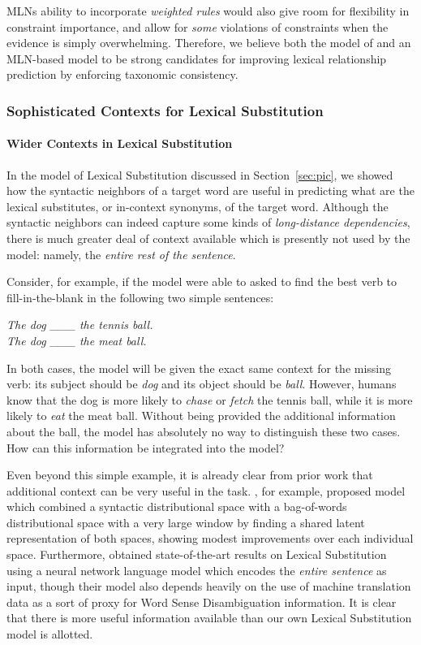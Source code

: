 \documentclass[12pt]{article}
\begin{document}
MLNs ability to incorporate {\em weighted rules} would also give room for
flexibility in constraint importance, and allow for {\em some} violations of
constraints when the evidence is simply overwhelming. Therefore, we believe
both the model of  and an MLN-based model to be strong
candidates for improving lexical relationship prediction by enforcing taxonomic
consistency.

\subsubsection{Sophisticated Contexts for Lexical Substitution}

\paragraph{Wider Contexts in Lexical Substitution}
In the model of Lexical Substitution discussed in Section~\ref{sec:pic}, we
showed how the syntactic neighbors of a target word are useful in predicting
what are the lexical substitutes, or in-context synonyms, of the target word.
Although the syntactic neighbors can indeed capture some kinds of {\em long-distance
dependencies}, there is much greater deal of context available which is
presently not used by the model: namely, the {\em entire rest of the sentence}.

Consider, for example, if the model were able to asked to find the best verb
to fill-in-the-blank in the following two simple sentences:

\begin{center}
  {\em The dog \_\_\_ the tennis ball.}\\
  {\em The dog \_\_\_ the meat ball.}
\end{center}

In both cases, the model will be given the exact same context for the missing
verb: its subject should be {\em dog} and its object should be {\em ball}. However,
humans know that the dog is more likely to {\em chase} or {\em fetch} the tennis
ball, while it is more likely to {\em eat} the meat ball. Without being provided
the additional information about the ball, the model has absolutely no way
to distinguish these two cases. How can this information be integrated into the
model?

Even beyond this simple example, it is already clear from prior work that
additional context can be very useful in the task.
, for example, proposed model which combined
a syntactic distributional space with a bag-of-words distributional space with
a very large window by finding a shared latent representation of both spaces,
showing modest improvements over each individual space. Furthermore,
 obtained state-of-the-art results on Lexical
Substitution using a neural network language model which encodes the {\em
entire sentence} as input, though their model also depends heavily on the use
of machine translation data as a sort of proxy for Word Sense Disambiguation
information. It is clear that there is more useful information
available than our own Lexical Substitution model is allotted.
\end{document}

